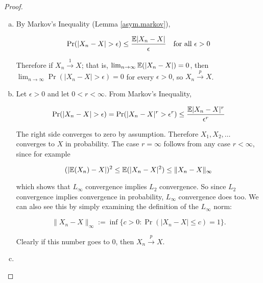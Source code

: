 \begin{proof}

\begin{enumerate}[(a)]

\item By Markov's Inequality (Lemma \ref{asym.markov}),

\[
\Pr(|X_n - X| > \epsilon) \leq \frac{\mathbb{E}|X_n - X|}{\epsilon} \ \ \text{ for all } \epsilon > 0
\]

Therefore if \(X_n \xrightarrow{1} X\); that is, \(\lim_{n \to \infty} \mathbb{E}(|X_n - X|) = 0\), then \(\lim_{n \to \infty} \Pr(|X_n -X| > \epsilon) = 0\) for every \(\epsilon > 0\), so \(X_n \xrightarrow{p} X\).



\item Let \(\epsilon > 0\) and let \(0 < r < \infty\). From Markov's Inequality,

\[
\Pr(|X_n - X| > \epsilon) = \Pr(|X_n - X|^r > \epsilon^r) \leq \frac{\mathbb{E}|X_n -X|^r}{\epsilon^r}
\]

The right side converges to zero by assumption. Therefore \(X_1, X_2, \ldots\) converges to \(X\) in probability. The case \(r = \infty\) follows from any case \(r < \infty\), since for example


\[
(|\mathbb{E}(X_n) - X|)^2 \leq \mathbb{E} (|X_n - X|^2) \leq \lVert X_n - X \rVert_\infty
\]

which shows that \(L_\infty\) convergence implies \(L_2\) convergence. So since \(L_2\) convergence implies convergence in probability, \(L_\infty\) convergence does too. We can also see this by simply examining the definition of the \(L_\infty\) norm:

 

\[
\lVert X_n - X \rVert_\infty := \inf \{c >0: \Pr(|X_n - X| \leq c ) = 1\}.
\]

Clearly if this number goes to 0, then \(X_n \xrightarrow{p} X\).

\item

\end{enumerate}

\end{proof}

